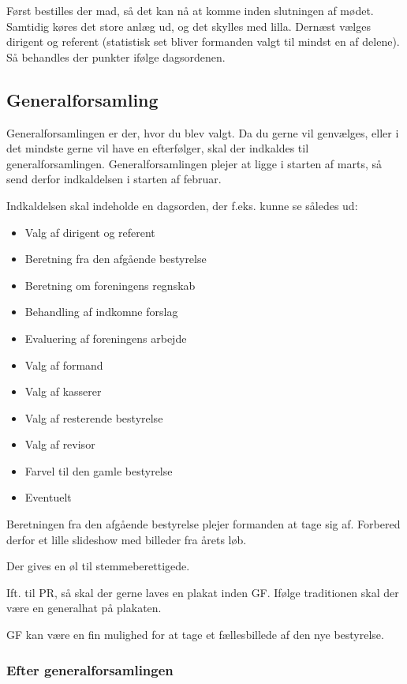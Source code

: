 Først bestilles der mad, så det kan nå at komme inden slutningen af
mødet. Samtidig køres det store anlæg ud, og det skylles med
lilla. Dernæst vælges dirigent og referent (statistisk set bliver
formanden valgt til mindst en af delene). Så behandles der punkter
ifølge dagsordenen.

\subsection{Generalforsamling}
\label{sec:generalforsamling}

Generalforsamlingen er der, hvor du blev valgt. Da du gerne vil
genvælges, eller i det mindste gerne vil have en efterfølger, skal der
indkaldes til generalforsamlingen. Generalforsamlingen plejer at ligge
i starten af marts, så send derfor indkaldelsen i starten af februar.

Indkaldelsen skal indeholde en dagsorden, der f.eks. kunne se således
ud:
\begin{itemize}
    \item Valg af dirigent og referent
    \item Beretning fra den afgående bestyrelse
    \item Beretning om foreningens regnskab
    \item Behandling af indkomne forslag
    \item Evaluering af foreningens arbejde
    \item Valg af formand
    \item Valg af kasserer
    \item Valg af resterende bestyrelse
    \item Valg af revisor
    \item Farvel til den gamle bestyrelse
    \item Eventuelt
\end{itemize}

Beretningen fra den afgående bestyrelse plejer formanden at tage sig
af. Forbered derfor et lille slideshow med billeder fra årets løb.

Der gives en øl til stemmeberettigede.

Ift. til PR, så skal der gerne laves en plakat inden GF. Ifølge
traditionen skal der være en generalhat på plakaten.

GF kan være en fin mulighed for at tage et fællesbillede af den nye
bestyrelse.

\subsubsection{Efter generalforsamlingen}


